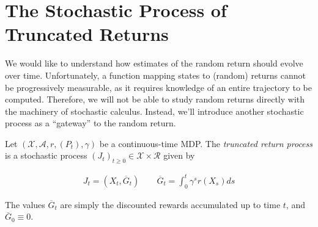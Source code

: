 \section{The Stochastic Process of Truncated Returns}\label{s:truncated-returns}
We would like to understand how estimates of the random return should
evolve over time. Unfortunately, a function mapping states to (random)
returns cannot be progressively measurable, as it requires knowledge
of an entire trajectory to be computed. Therefore, we will not be able
to study random returns directly with the machinery of stochastic
calculus. Instead, we'll introduce another stochastic process as a
``gateway'' to the random return.

\begin{definition}\label{def:truncated-return}
  Let $(\mathcal{X},\mathcal{A},r,(P_t),\gamma)$ be a continuous-time
  MDP. The \emph{truncated return process} is a stochastic process
  $(J_t)_{t\geq 0}\in\mathcal{X}\times\mathcal{R}$ given by

  \begin{equation*}
    \begin{aligned}
      J_t = (X_t, \overline{G}_t)\qquad\overline{G}_t = \int_0^t\gamma^sr(X_s)ds
    \end{aligned}
  \end{equation*}

  The values $\overline{G}_t$ are simply the discounted rewards
  accumulated up to time $t$, and $\overline{G}_0\equiv 0$.
\end{definition}

